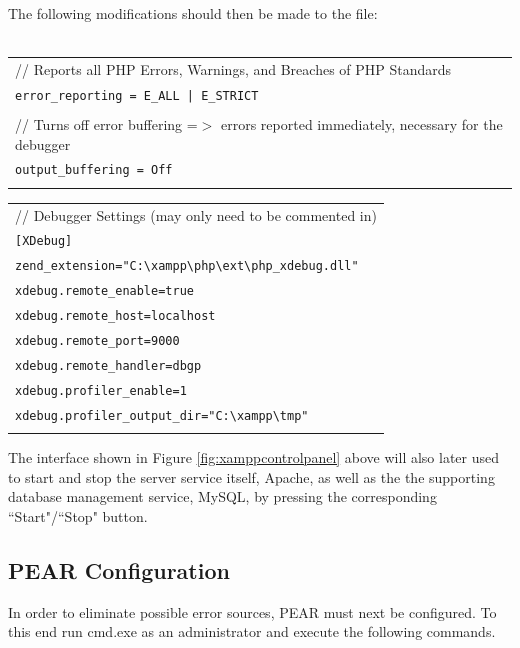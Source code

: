 \documentclass[]{report}
\begin{document}
The following modifications should then be made to the file:\\
\\

\begin{tabular}{l}
// Reports all PHP Errors, Warnings, and Breaches of PHP Standards\\
\texttt{error\_reporting = E\_ALL | E\_STRICT}\\\\

// Turns off error buffering =$>$ errors reported immediately, necessary for the debugger\\
\texttt{output\_buffering = Off} \\\\
\end{tabular}

\begin{tabular}{l}
// Debugger Settings (may only need to be commented in)\\
\texttt{[XDebug]} \\
\texttt{zend\_extension="C:\textbackslash xampp\textbackslash php\textbackslash ext\textbackslash php\_xdebug.dll"}\\
\texttt{xdebug.remote\_enable=true}\\
\texttt{xdebug.remote\_host=localhost}\\
\texttt{xdebug.remote\_port=9000}\\
\texttt{xdebug.remote\_handler=dbgp}\\
\texttt{xdebug.profiler\_enable=1}\\
\texttt{xdebug.profiler\_output\_dir="C:\textbackslash xampp\textbackslash tmp"}\\\\
\end{tabular}

\noindent
The interface shown in Figure \ref{fig:xamppcontrolpanel} above will also later used to start and stop the server service itself, Apache, as well as the the supporting database management service, MySQL, by pressing the corresponding ``Start"/``Stop" button.

\subsection{PEAR Configuration}

In order to eliminate possible error sources, PEAR must next be configured. To this end run cmd.exe as an administrator and execute the following commands.\\
\end{document}

